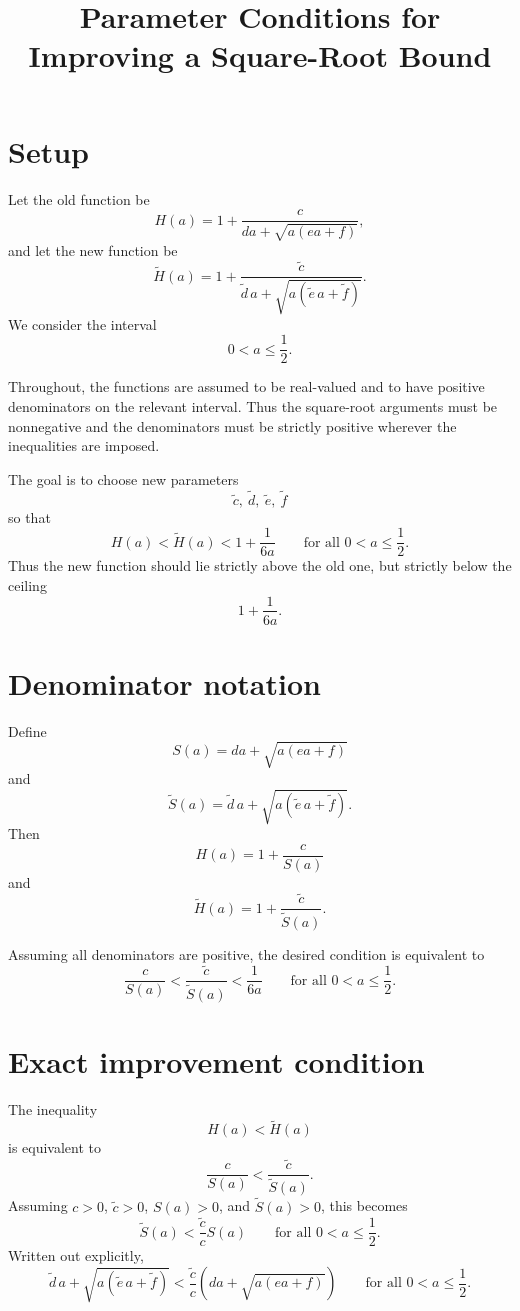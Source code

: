 \documentclass[11pt]{article}
\title{Parameter Conditions for Improving a Square-Root Bound}
\author{}
\date{}
\begin{document}
\maketitle

\section{Setup}

Let the old function be
\[
H(a)
=
1+\frac{c}{da+\sqrt{a(ea+f)}},
\]
and let the new function be
\[
\widetilde H(a)
=
1+\frac{\widetilde c}
{\widetilde d\,a+\sqrt{a(\widetilde e\,a+\widetilde f)}}.
\]
We consider the interval
\[
0<a\le \frac12.
\]

Throughout, the functions are assumed to be real-valued and to have positive denominators on the relevant interval. Thus the square-root arguments must be nonnegative and the denominators must be strictly positive wherever the inequalities are imposed.

The goal is to choose new parameters
\[
\widetilde c,\ \widetilde d,\ \widetilde e,\ \widetilde f
\]
so that
\[
\boxed{
H(a)<\widetilde H(a)<1+\frac{1}{6a}
\qquad
\text{for all }0<a\le \frac12.
}
\]
Thus the new function should lie strictly above the old one, but strictly below the ceiling
\[
1+\frac{1}{6a}.
\]

\section{Denominator notation}

Define
\[
S(a)
=
da+\sqrt{a(ea+f)}
\]
and
\[
\widetilde S(a)
=
\widetilde d\,a+\sqrt{a(\widetilde e\,a+\widetilde f)}.
\]
Then
\[
H(a)=1+\frac{c}{S(a)}
\]
and
\[
\widetilde H(a)=1+\frac{\widetilde c}{\widetilde S(a)}.
\]

Assuming all denominators are positive, the desired condition is equivalent to
\[
\frac{c}{S(a)}
<
\frac{\widetilde c}{\widetilde S(a)}
<
\frac{1}{6a}
\qquad
\text{for all }0<a\le\frac12.
\]

\section{Exact improvement condition}

The inequality
\[
H(a)<\widetilde H(a)
\]
is equivalent to
\[
\frac{c}{S(a)}
<
\frac{\widetilde c}{\widetilde S(a)}.
\]
Assuming \(c>0\), \(\widetilde c>0\), \(S(a)>0\), and \(\widetilde S(a)>0\), this becomes
\[
\boxed{
\widetilde S(a)
<
\frac{\widetilde c}{c}S(a)
\qquad
\text{for all }0<a\le\frac12.
}
\]
Written out explicitly,
\[
\boxed{
\widetilde d\,a+\sqrt{a(\widetilde e\,a+\widetilde f)}
<
\frac{\widetilde c}{c}
\left(
da+\sqrt{a(ea+f)}
\right)
\qquad
\text{for all }0<a\le\frac12.
}
\]
\end{document}
